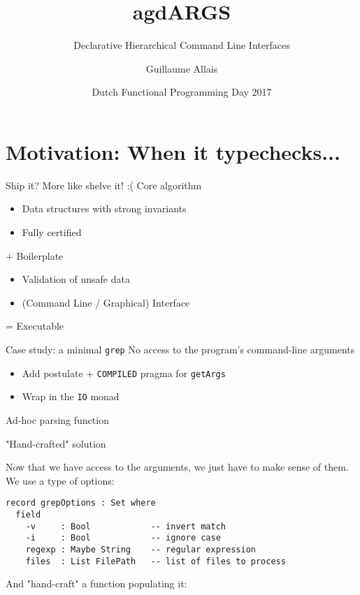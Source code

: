 \documentclass[dvipsnames]{beamer}
\title{agdARGS}
\subtitle{Declarative Hierarchical Command Line Interfaces}
\author[G. Allais]{Guillaume Allais}
\institute[Radboud]{Radboud University}
\date[NL FP Dag 17]{Dutch Functional Programming Day 2017}
\begin{document}
\begin{frame}
 \maketitle
\end{frame}

\section{Motivation: When it typechecks...}

\begin{frame}{Ship it? More like shelve it! :(}
  Core algorithm
    \begin{itemize}
      \item Data structures with strong invariants
      \item Fully certified
    \end{itemize}
  + Boilerplate
    \begin{itemize}
      \item Validation of unsafe data
      \item (Command Line / Graphical) Interface
    \end{itemize}
  = Executable
\end{frame}

\begin{frame}{Case study: a minimal \texttt{grep}}
No access to the program's command-line arguments
  \begin{itemize}
    \item Add postulate + \texttt{COMPILED} pragma for \texttt{getArgs}
    \item Wrap in the \texttt{IO} monad
  \end{itemize}
Ad-hoc parsing function
\end{frame}

\begin{frame}[fragile]{"Hand-crafted" solution}

Now that we have access to the arguments, we just have to make sense
of them. We use a type of options:

\begin{verbatim}
record grepOptions : Set where
  field
    -v     : Bool            -- invert match
    -i     : Bool            -- ignore case
    regexp : Maybe String    -- regular expression
    files  : List FilePath   -- list of files to process
\end{verbatim}

And "hand-craft" a function populating it:
\end{frame}
\end{document}
